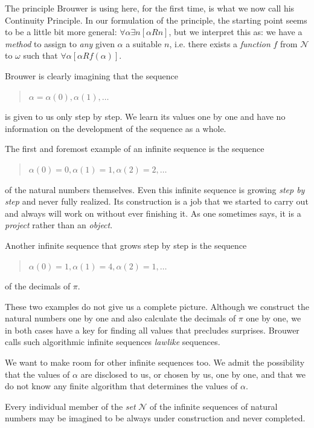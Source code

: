 \documentclass[a4paper]{amsart}
\theoremstyle{plain}
\begin{document}
The principle Brouwer is using  here, for the first time, is  what we now call his Continuity Principle. In our  formulation of the principle,   the starting point seems to be  a little bit more general: $\forall \alpha\exists n[\alpha R n]$, but we interpret this as: we  have a {\it method} to assign to {\it any} given $\alpha$ a suitable $n$, i.e.   there exists a {\it function} $f$ from $\mathcal{N}$ to $\omega$ such that $\forall \alpha[\alpha R f(\alpha)]$. 

Brouwer is clearly imagining that the sequence \begin{quote} $\alpha=\alpha(0), \alpha(1), \ldots$ \end{quote} is given to us only step by step.  We learn its values one by one and have no information on the development of the sequence as a whole.  

 The first and foremost example of   an infinite sequence is the  sequence \begin{quote} $\alpha(0)=0, \alpha(1)=1, \alpha(2)=2,\ldots$ \end{quote} of the natural numbers themselves. Even this infinite sequence is growing {\it step by step} and never fully realized. Its construction  is a job that we started to carry out and always will work on without ever finishing it. As one sometimes says, it is a {\it project} rather than an {\it object}.

Another infinite sequence that grows step by step is the sequence \begin{quote} $\alpha(0)= 1, \alpha(1)= 4, \alpha(2) =1, \ldots$ \end{quote} of the decimals of $\pi$. 

These two examples do not give us a complete picture. 
Although we construct the natural numbers one by one and  also calculate the decimals of $\pi$ one by one, we  in both cases have a key for finding  all  values that precludes surprises. Brouwer calls such algorithmic infinite sequences {\it lawlike} sequences.

We want to make room for other infinite sequences too.
We admit the possibility that the values of $\alpha$ are disclosed to us, or chosen by us, one by one, and that we do not know any finite algorithm that determines the values of $\alpha$. 



 
Every  individual member of  the {\it set} $\mathcal{N}$ of the infinite sequences of natural numbers may be imagined to be  always under construction and never completed.
\end{document}
